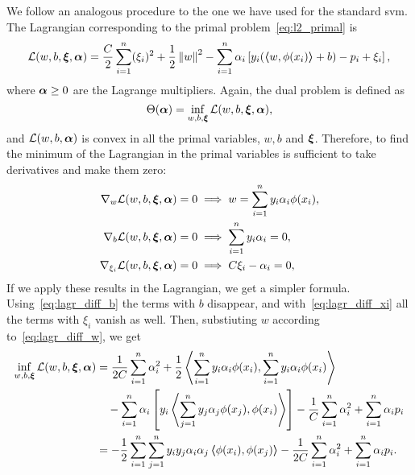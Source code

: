 %
We follow an analogous procedure to the one we have used for the standard \acrshort{svm}. The Lagrangian corresponding to the primal problem~\eqref{eq:l2_primal} is 
\begin{equation}
    \label{eq:l2_lagr}
    \lagr(w, b, \fv{\xi}, \fv{\alpha}) = \frac{C}{2} \sum_{i=1}^\nsamples (\xi_i)^2 + \frac{1}{2} \norm{w}^2 - \sum_{i=1}^\nsamples \alpha_i \left[ y_i (\dotp{w}{\phi(x_i)} + b) - p_i + \xi_i \right] ,
\end{equation}
%
where $\bm{\alpha} \geq 0$ are the Lagrange multipliers.
%
Again, the dual problem is defined as 
$$ \Theta(\bm{\alpha}) = \inf_{w, b, \bm{\xi}} \mathcal{L}(w, b, \bm{\xi}, \bm{\alpha}) , $$
and $\mathcal{L}(w, b, \bm{\alpha})$ is convex in all the primal variables, $w, b$ and $\bm{\xi}$. Therefore, to find the minimum of the Lagrangian in the primal variables is sufficient to take derivatives and make them zero:
\begin{align}
    \nabla_w \lagr(w, b, \fv{\xi}, \fv{\alpha}) = 0 &\implies w = \sum_{i=1}^\nsamples y_i \alpha_i \phi(x_i) , \label{eq:lagr_diff_w_l2} \\
    \nabla_b \lagr(w, b, \fv{\xi}, \fv{\alpha}) = 0 &\implies \sum_{i=1}^\nsamples y_i \alpha_i = 0, \label{eq:lagr_diff_b_l2} \\
    \nabla_{\xi_i} \lagr(w, b, \fv{\xi}, \fv{\alpha}) = 0 &\implies C \xi_i - \alpha_i  = 0 , \label{eq:lagr_diff_xi_l2}
\end{align}
If we apply these results in the Lagrangian, we get a simpler formula. Using~\eqref{eq:lagr_diff_b} the terms with $b$ disappear, and with~\eqref{eq:lagr_diff_xi} all the terms with $\xi_i$ vanish as well. Then, substiuting $w$ according to~\eqref{eq:lagr_diff_w}, we get 
\begin{equation}
    \nonumber
    \begin{aligned}
        \inf_{w, b, \bm{\xi}} \mathcal{L}(w, b, \bm{\xi}, \bm{\alpha}) &= \frac{1}{2C} \sum_{i=1}^n \alpha_i^2 + \frac{1}{2} \bm{\left\langle} \sum_{i=1}^n y_i \alpha_i \phi(x_i), \sum_{i=1}^n y_i \alpha_i \phi(x_i) \bm{\right\rangle} \\
        &\quad- \sum_{i=1}^n \alpha_i \left[y_i \bm{\left\langle} \sum_{j=1}^n y_j \alpha_j \phi(x_j), \phi(x_i) \bm{\right\rangle}  \right] - \frac{1}{C} \sum_{i=1}^n \alpha_i^2 + \sum_{i=1}^n \alpha_i p_i  \\
        &= -\frac{1}{2} \sum_{i=1}^n \sum_{j=1}^n y_i y_j \alpha_i \alpha_j \bm{\left\langle} \phi(x_i), \phi(x_j) \bm{\right\rangle} - \frac{1}{2C} \sum_{i=1}^n \alpha_i^2 + \sum_{i=1}^n \alpha_i p_i .
    \end{aligned}
\end{equation}
